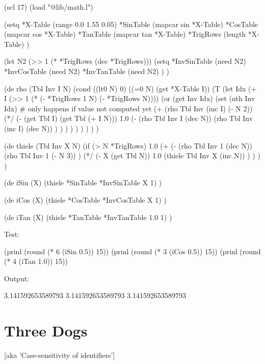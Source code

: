 \begin{wideverbatim}

(scl 17)
(load "@lib/math.l")

(setq
   *X-Table (range 0.0 1.55 0.05)
   *SinTable (mapcar sin *X-Table)
   *CosTable (mapcar cos *X-Table)
   *TanTable (mapcar tan *X-Table)
   *TrigRows (length *X-Table) )

(let N2 (>> 1 (* *TrigRows (dec *TrigRows)))
   (setq
      *InvSinTable (need N2)
      *InvCosTable (need N2)
      *InvTanTable (need N2) ) )

(de rho (Tbl Inv I N)
   (cond
      ((lt0 N) 0)
      ((=0 N) (get *X-Table I))
      (T
         (let Idx (+ I (>> 1 (* (- *TrigRows 1 N) (- *TrigRows N))))
            (or
               (get Inv Idx)
               (set (nth Inv Idx)  # only happens if value not computed yet
                  (+
                     (rho Tbl Inv (inc I) (- N 2))
                     (*/
                        (- (get Tbl I) (get Tbl (+ I N)))
                        1.0
                        (-
                           (rho Tbl Inv I (dec N))
                           (rho Tbl Inv (inc I) (dec N)) ) ) ) ) ) ) ) ) )

(de thiele (Tbl Inv X N)
   (if (> N *TrigRows)
      1.0
      (+
         (-
            (rho Tbl Inv 1 (dec N))
            (rho Tbl Inv 1 (- N 3)) )
         (*/
            (- X (get Tbl N))
            1.0
            (thiele Tbl Inv X (inc N)) ) ) ) )

\end{wideverbatim}

\begin{wideverbatim}

(de iSin (X)
   (thiele *SinTable *InvSinTable X 1) )

(de iCos (X)
   (thiele *CosTable *InvCosTable X 1) )

(de iTan (X)
   (thiele *TanTable *InvTanTable 1.0 1) )

Test:

(prinl (round (* 6 (iSin 0.5)) 15))
(prinl (round (* 3 (iCos 0.5)) 15))
(prinl (round (* 4 (iTan 1.0)) 15))

Output:

3.141592653589793
3.141592653589793
3.141592653589793

\end{wideverbatim}

\pagebreak{}
\section*{Three Dogs}
[aka 'Case-sensitivity of identifiers']

